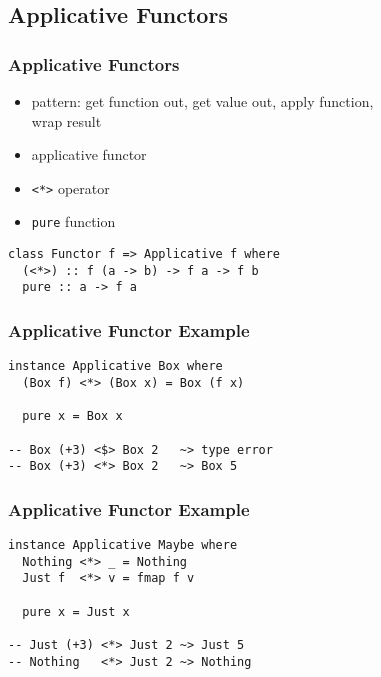 \documentclass[dvipsnames]{beamer}
\theoremstyle{plain}
\begin{document}
\subsection{Applicative Functors}

\begin{frame}[fragile]
  \frametitle{Applicative Functors}

  \begin{itemize}
    \item pattern: get function out, get value out, apply function,\\
      wrap result
    \item \alert{applicative functor}
    \item \lstinline|<*>| operator
    \item \lstinline|pure| function
  \end{itemize}

  \begin{lstlisting}
class Functor f => Applicative f where
  (<*>) :: f (a -> b) -> f a -> f b
  pure :: a -> f a
  \end{lstlisting}
\end{frame}

\begin{frame}[fragile]
  \frametitle{Applicative Functor Example}

  \begin{lstlisting}
instance Applicative Box where
  (Box f) <*> (Box x) = Box (f x)

  pure x = Box x

-- Box (+3) <$> Box 2   ~> type error
-- Box (+3) <*> Box 2   ~> Box 5
  \end{lstlisting}
\end{frame}

\begin{frame}[fragile]
  \frametitle{Applicative Functor Example}

  \begin{lstlisting}
instance Applicative Maybe where
  Nothing <*> _ = Nothing
  Just f  <*> v = fmap f v

  pure x = Just x

-- Just (+3) <*> Just 2 ~> Just 5
-- Nothing   <*> Just 2 ~> Nothing
  \end{lstlisting}
\end{frame}
\end{document}
